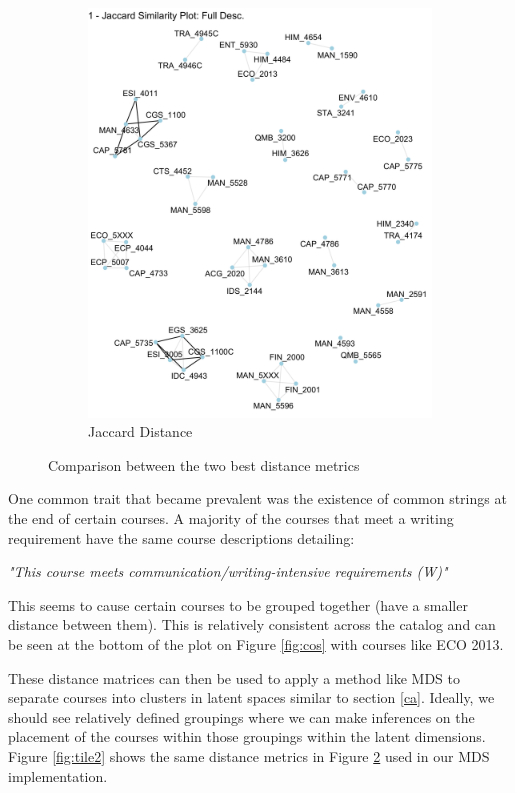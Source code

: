 \begin{figure}[H]
\begin{subfigure}{.5\textwidth}
  \includegraphics[width=1\linewidth]{Content/images/jac.png}
  \caption{Jaccard Distance}
  \label{fig:jac}
\end{subfigure}
\caption{Comparison between the two best distance metrics}
\label{fig:tile}
\end{figure}

One common trait that became prevalent was the existence of common strings at the end of certain courses.  A majority of the courses that meet a writing 
requirement have the same course descriptions detailing:

 \textit{"This course meets communication/writing-intensive requirements (W)"} 
 
This seems to cause certain courses to be grouped together (have a smaller distance between them).  This is relatively consistent across the catalog and can 
be seen at the bottom of the plot on Figure \ref{fig:cos} with courses like ECO 2013. 

These distance matrices can then be used to apply a method like MDS to separate courses into clusters in latent spaces similar to section \ref{ca}. Ideally, 
we should see relatively defined groupings where we can make inferences on the placement of the courses within those groupings within the latent dimensions.  
Figure \ref{fig:tile2} shows the same distance metrics in Figure \ref{fig:tile} used in our MDS implementation.

